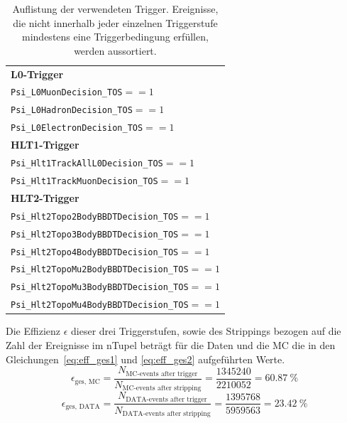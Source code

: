 \begin{table}[htb]
  \centering
  \caption{Auflistung der verwendeten Trigger.
  Ereignisse, die nicht innerhalb jeder einzelnen Triggerstufe mindestens eine Triggerbedingung erfüllen, werden aussortiert.}
  \begin{tabular}{l}
    \toprule
    \textbf{L0-Trigger}                                           \\
    \quad\texttt{Psi\_L0MuonDecision\_TOS}\quad$==1$              \\
    \quad\texttt{Psi\_L0HadronDecision\_TOS}\quad$==1$            \\
    \quad\texttt{Psi\_L0ElectronDecision\_TOS}\quad$==1$          \\
    \midrule
    \textbf{HLT1-Trigger}                                         \\
    \quad\texttt{Psi\_Hlt1TrackAllL0Decision\_TOS}\quad$==1$      \\
    \quad\texttt{Psi\_Hlt1TrackMuonDecision\_TOS}\quad$==1$       \\
    \midrule
    \textbf{HLT2-Trigger}                                         \\
    \quad\texttt{Psi\_Hlt2Topo2BodyBBDTDecision\_TOS}\quad$==1$   \\
    \quad\texttt{Psi\_Hlt2Topo3BodyBBDTDecision\_TOS}\quad$==1$   \\
    \quad\texttt{Psi\_Hlt2Topo4BodyBBDTDecision\_TOS}\quad$==1$   \\
    \quad\texttt{Psi\_Hlt2TopoMu2BodyBBDTDecision\_TOS}\quad$==1$ \\
    \quad\texttt{Psi\_Hlt2TopoMu3BodyBBDTDecision\_TOS}\quad$==1$ \\
    \quad\texttt{Psi\_Hlt2TopoMu4BodyBBDTDecision\_TOS}\quad$==1$ \\
    \bottomrule
  \end{tabular}
  \label{tab:trigger}
\end{table}
%
Die Effizienz $\epsilon$ dieser drei Triggerstufen, sowie des Strippings bezogen auf die Zahl der Ereignisse im nTupel beträgt für die Daten und die MC die in den Gleichungen~\ref{eq:eff_ges1} und \ref{eq:eff_ges2} aufgeführten Werte.
%
\begin{equation}
  \epsilon_\text{ges, MC}=\frac{N_\text{MC-events after trigger}}{N_\text{MC-events after stripping}}=\frac{1345240}{2210052}=\SI{60.87}{\percent}
  \label{eq:eff_ges1}
\end{equation}
\begin{equation}
  \epsilon_\text{ges, DATA}=\frac{N_\text{DATA-events after trigger}}{N_\text{DATA-events after stripping}}=\frac{1395768}{5959563}=\SI{23.42}{\percent}
  \label{eq:eff_ges2}
\end{equation}
%
